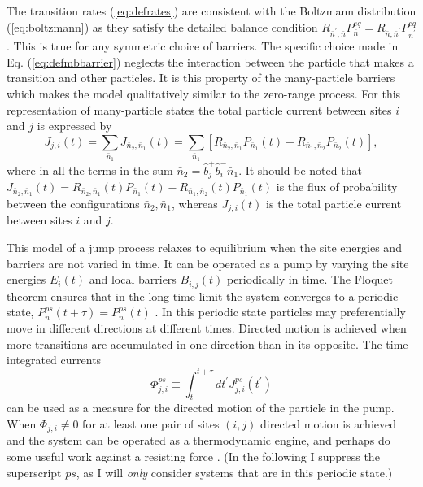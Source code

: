 \documentclass[aps,pre,showpacs,amsmath,amssymb,amsfonts,superscriptaddress,onecolumn,longbibliography]{revtex4-1}
\begin{document}
The transition rates (\ref{eq:defrates}) are consistent with the Boltzmann distribution (\ref{eq:boltzmann}) as they satisfy
the detailed balance condition $R_{\bar{n}^\prime, \bar{n}}P_{\bar{n}}^{eq}=R_{\bar{n}, \bar{n}^\prime}P_{\bar{n}^\prime}^{eq}$. This is true for
any symmetric choice of barriers. The specific choice made in Eq. (\ref{eq:defmbbarrier}) neglects the interaction between
the particle that makes a transition and other particles. It is this property of the many-particle barriers which makes the model qualitatively similar to the zero-range process.
For this representation
of many-particle states the total particle current between sites $i$ and $j$
is expressed by \cite{mandal_unification_2014}
\begin{equation}
\label{eq:totcurrent}
  J_{j,i} (t)= \sum_{\bar{n}_1} J_{\bar{n}_2,\bar{n}_1}(t)=\sum_{\bar{n}_1} \left[ R_{ \bar{n}_2,\bar{n}_1} P_{\bar{n}_1}(t)- R_{\bar{n}_1,\bar{n}_2}   P_{\bar{n}_2}(t) \right],
\end{equation}
where in all the terms in the sum $\bar{n}_2=\hat{b}_j^+ \hat{b}_i^- \bar{n}_1$. It should be noted that $J_{\bar{n}_2,\bar{n}_1}(t)=R_{ \bar{n}_2,\bar{n}_1}(t) P_{\bar{n}_1}(t)- R_{\bar{n}_1,\bar{n}_2} (t)  P_{\bar{n}_1}(t)$ is the flux of probability between the configurations $\bar{n}_2,\bar{n}_1$, whereas $J_{j,i}(t)$ is the total
particle current between sites $i$ and $j$.

This model of a jump process relaxes to equilibrium when the site energies and barriers are not varied in time. It can be operated as a pump
by varying the site energies $E_{i}(t)$ and local barriers $B_{i,j} (t)$ periodically in time.
 The Floquet theorem ensures that in the long time limit the system converges to a periodic
state, $P^{ps}_{\bar{n}}(t+\tau) = P^{ps}_{\bar{n}}(t)$ \cite{Talkner1999}. In this periodic state particles
may preferentially move in different directions at different times. Directed
motion is achieved when more transitions are accumulated in one direction than in its opposite. The time-integrated currents
\begin{equation}
\label{eq:defintc}
  \Phi_{j,i}^{ps} \equiv \int_{t}^{t+\tau} dt^\prime J_{j,i}^{ps} (t^\prime)
\end{equation}
can be used as a measure for the directed motion of the particle in the pump. When $ \Phi_{j,i} \ne0$ for at least one pair of sites $(i,j)$ directed motion is achieved
and the system can be operated as a thermodynamic engine, and perhaps do some useful work against a resisting force \cite{rahav_extracting_2011}. (In the following
I suppress the superscript $ps$, as I will {\em only} consider systems that are in this periodic state.)
\end{document}
